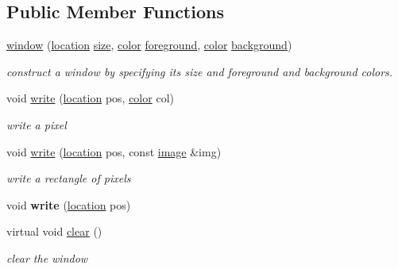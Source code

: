 \subsection*{Public Member Functions}
\begin{DoxyCompactItemize}
\item 
\hyperlink{classhwlib_1_1window_a5acfb1afba5adade79ae1576831128f1}{window} (\hyperlink{classhwlib_1_1location}{location} \hyperlink{classhwlib_1_1window_ad2ad5281c9c09d18010b19cb807d3eaa}{size}, \hyperlink{classhwlib_1_1color}{color} \hyperlink{classhwlib_1_1window_a812e3bf440309bf3280d34fa04eeb718}{foreground}, \hyperlink{classhwlib_1_1color}{color} \hyperlink{classhwlib_1_1window_a1ca47e79ec54ea8b2f38b41b42593d2d}{background})\hypertarget{classhwlib_1_1window_a5acfb1afba5adade79ae1576831128f1}{}\label{classhwlib_1_1window_a5acfb1afba5adade79ae1576831128f1}

\begin{DoxyCompactList}\small\item\em construct a window by specifying its size and foreground and background colors. \end{DoxyCompactList}\item 
void \hyperlink{classhwlib_1_1window_a65122042afeb55e41e5c03b5c8e26fff}{write} (\hyperlink{classhwlib_1_1location}{location} pos, \hyperlink{classhwlib_1_1color}{color} col)
\begin{DoxyCompactList}\small\item\em write a pixel \end{DoxyCompactList}\item 
void \hyperlink{classhwlib_1_1window_ac87b3f0e82ab260f95a68e76f827d03b}{write} (\hyperlink{classhwlib_1_1location}{location} pos, const \hyperlink{classhwlib_1_1image}{image} \&img)
\begin{DoxyCompactList}\small\item\em write a rectangle of pixels \end{DoxyCompactList}\item 
void {\bfseries write} (\hyperlink{classhwlib_1_1location}{location} pos)\hypertarget{classhwlib_1_1window_ac90b74315df62b9952ce2ee3af95825b}{}\label{classhwlib_1_1window_ac90b74315df62b9952ce2ee3af95825b}

\item 
virtual void \hyperlink{classhwlib_1_1window_a5e781163353ce26cb4dc5b2cbe40ad05}{clear} ()
\begin{DoxyCompactList}\small\item\em clear the window \end{DoxyCompactList}\end{DoxyCompactItemize}

